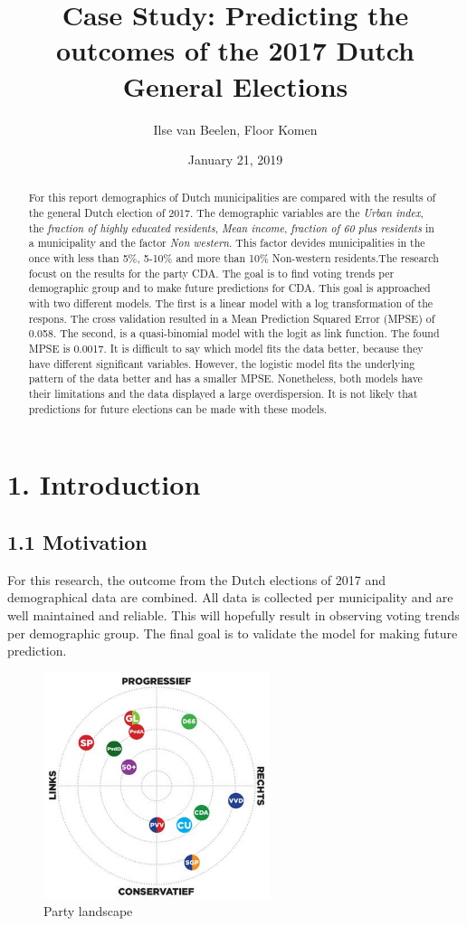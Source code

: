 \documentclass[11pt,]{article}
\title{Case Study: Predicting the outcomes of the 2017 Dutch General Elections}
\author{Ilse van Beelen, Floor Komen}
\date{January 21, 2019}
\begin{document}
\maketitle
\begin{abstract}
For this report demographics of Dutch municipalities are compared with
the results of the general Dutch election of 2017. The demographic
variables are the \emph{Urban index}, the \emph{fraction of highly
educated residents}, \emph{Mean income}, \emph{fraction of 60 plus
residents} in a municipality and the factor \emph{Non western}. This
factor devides municipalities in the once with less than 5\%, 5-10\% and
more than 10\% Non-western residents.The research focust on the results
for the party CDA. The goal is to find voting trends per demographic
group and to make future predictions for CDA. This goal is approached
with two different models. The first is a linear model with a log
transformation of the respons. The cross validation resulted in a Mean
Prediction Squared Error (MPSE) of 0.058. The second, is a
quasi-binomial model with the logit as link function. The found MPSE is
0.0017. It is difficult to say which model fits the data better, because
they have different significant variables. However, the logistic model
fits the underlying pattern of the data better and has a smaller MPSE.
Nonetheless, both models have their limitations and the data displayed a
large overdispersion. It is not likely that predictions for future
elections can be made with these models.
\end{abstract}

\section{1. Introduction}\label{introduction}

\subsection{1.1 Motivation}\label{motivation}

For this research, the outcome from the Dutch elections of 2017 and
demographical data are combined. All data is collected per municipality
and are well maintained and reliable. This will hopefully result in
observing voting trends per demographic group. The final goal is to
validate the model for making future prediction.

\begin{figure}
\centering
\includegraphics[width=2.60417in]{Partijlandschap.jpg}
\caption{Party landscape}
\end{figure}
\end{document}
